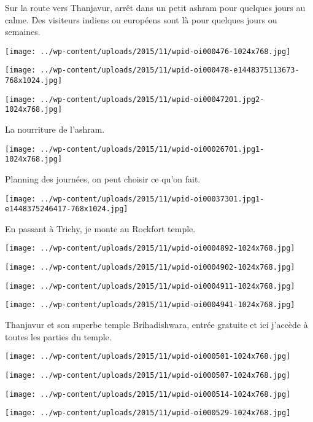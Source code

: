 \pagebreak
 Sur la route vers Thanjavur, arrêt dans un petit ashram pour quelques jours au calme. Des visiteurs indiens ou européens sont là pour quelques jours ou semaines. 
\begin{center} \texttt{[image: ../wp-content/uploads/2015/11/wpid-oi000476-1024x768.jpg]} \end{center}
\begin{center} \texttt{[image: ../wp-content/uploads/2015/11/wpid-oi000478-e1448375113673-768x1024.jpg]} \end{center}
\begin{center} \texttt{[image: ../wp-content/uploads/2015/11/wpid-oi00047201.jpg2-1024x768.jpg]} \end{center}

  La nourriture de l'ashram. 
\begin{center} \texttt{[image: ../wp-content/uploads/2015/11/wpid-oi00026701.jpg1-1024x768.jpg]} \end{center}

\pagebreak
 Planning des journées, on peut choisir ce qu'on fait. 
\begin{center} \texttt{[image: ../wp-content/uploads/2015/11/wpid-oi00037301.jpg1-e1448375246417-768x1024.jpg]} \end{center}

 En passant à Trichy, je monte au Rockfort temple. 
\begin{center} \texttt{[image: ../wp-content/uploads/2015/11/wpid-oi0004892-1024x768.jpg]} \end{center}
\begin{center} \texttt{[image: ../wp-content/uploads/2015/11/wpid-oi0004902-1024x768.jpg]} \end{center}
\begin{center} \texttt{[image: ../wp-content/uploads/2015/11/wpid-oi0004911-1024x768.jpg]} \end{center}
\begin{center} \texttt{[image: ../wp-content/uploads/2015/11/wpid-oi0004941-1024x768.jpg]} \end{center}

 Thanjavur et son superbe temple Brihadishwara, entrée gratuite et ici j'accède à toutes les parties du temple. 
\begin{center} \texttt{[image: ../wp-content/uploads/2015/11/wpid-oi000501-1024x768.jpg]} \end{center}
\begin{center} \texttt{[image: ../wp-content/uploads/2015/11/wpid-oi000507-1024x768.jpg]} \end{center}
\begin{center} \texttt{[image: ../wp-content/uploads/2015/11/wpid-oi000514-1024x768.jpg]} \end{center}
\begin{center} \texttt{[image: ../wp-content/uploads/2015/11/wpid-oi000529-1024x768.jpg]} \end{center}

